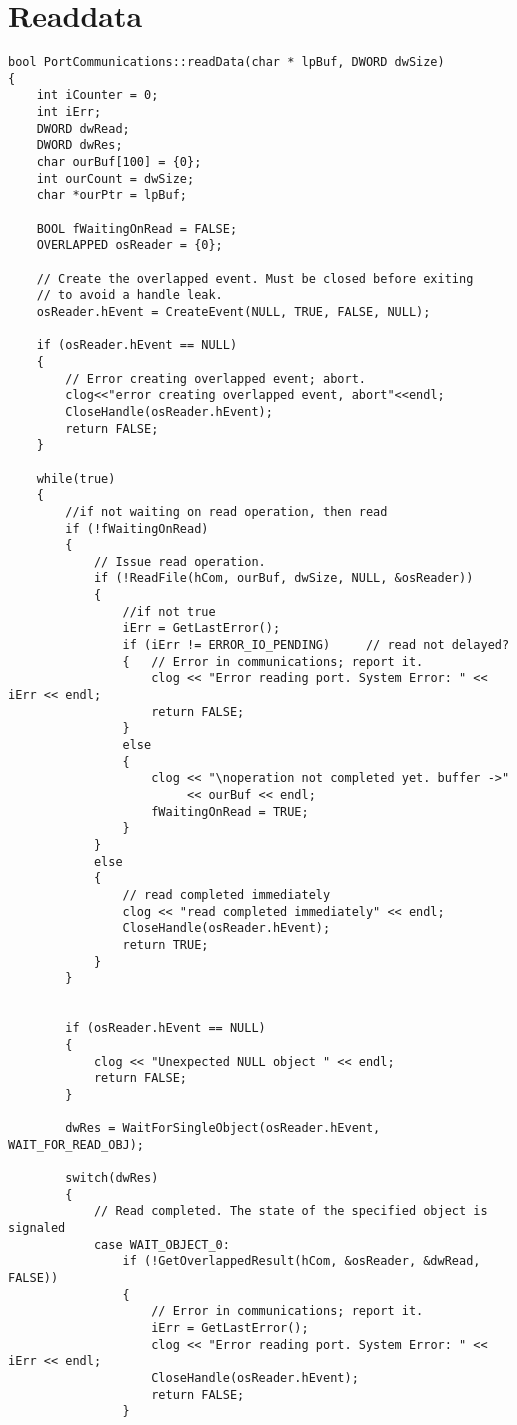 \newpage
\section{Readdata}\label{ReadDataCode}

\begin{lstlisting}
bool PortCommunications::readData(char * lpBuf, DWORD dwSize)
{
	int iCounter = 0;
	int iErr;
	DWORD dwRead;
	DWORD dwRes;
	char ourBuf[100] = {0};
	int ourCount = dwSize;
	char *ourPtr = lpBuf;

	BOOL fWaitingOnRead = FALSE;
	OVERLAPPED osReader = {0};

	// Create the overlapped event. Must be closed before exiting
	// to avoid a handle leak.
	osReader.hEvent = CreateEvent(NULL, TRUE, FALSE, NULL);

	if (osReader.hEvent == NULL)
	{
		// Error creating overlapped event; abort.
		clog<<"error creating overlapped event, abort"<<endl;
		CloseHandle(osReader.hEvent);
		return FALSE;
	}

	while(true)
	{
		//if not waiting on read operation, then read
		if (!fWaitingOnRead)
		{
			// Issue read operation.
			if (!ReadFile(hCom, ourBuf, dwSize, NULL, &osReader))
			{
				//if not true
				iErr = GetLastError();
				if (iErr != ERROR_IO_PENDING)     // read not delayed?
				{	// Error in communications; report it.
					clog << "Error reading port. System Error: " << iErr << endl;
					return FALSE;
				}
				else
				{
					clog << "\noperation not completed yet. buffer ->"
					     << ourBuf << endl;
					fWaitingOnRead = TRUE;
				}
			}
			else
			{    
				// read completed immediately
				clog << "read completed immediately" << endl;
				CloseHandle(osReader.hEvent);
				return TRUE;
			}
		}	

	
		if (osReader.hEvent == NULL)
		{
			clog << "Unexpected NULL object " << endl;
			return FALSE;
		}

		dwRes = WaitForSingleObject(osReader.hEvent, WAIT_FOR_READ_OBJ);
		
		switch(dwRes)
		{
			// Read completed. The state of the specified object is signaled	
			case WAIT_OBJECT_0:  
				if (!GetOverlappedResult(hCom, &osReader, &dwRead, FALSE))
				{
					// Error in communications; report it.
					iErr = GetLastError();
					clog << "Error reading port. System Error: " << iErr << endl;
					CloseHandle(osReader.hEvent);
					return FALSE;
				}


\end{lstlisting}
